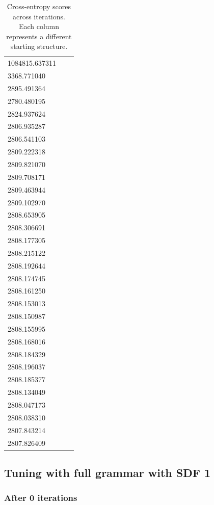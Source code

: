 \begin{table}\begin{tabular}{|l|l|l|}
\hline
1084815.637311\\
3368.771040\\
2895.491364\\
2780.480195\\
2824.937624\\
2806.935287\\
2806.541103\\
2809.222318\\
2809.821070\\
2809.708171\\
2809.463944\\
2809.102970\\
2808.653905\\
2808.306691\\
2808.177305\\
2808.215122\\
2808.192644\\
2808.174745\\
2808.161250\\
2808.153013\\
2808.150987\\
2808.155995\\
2808.168016\\
2808.184329\\
2808.196037\\
2808.185377\\
2808.134049\\
2808.047173\\
2808.038310\\
2807.843214\\
2807.826409\\
\hline
\end{tabular}\caption{
  Cross-entropy scores across iterations. Each column represents a different starting structure.}\end{table}

\subsection{Tuning with full grammar with SDF 1}

\subsubsection{After 0 iterations}

